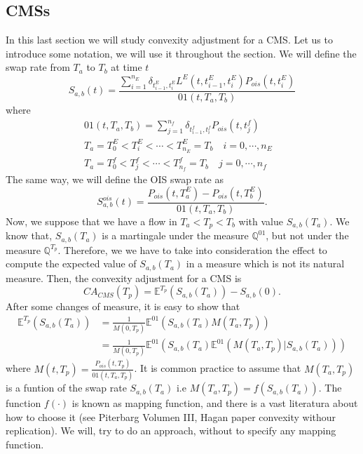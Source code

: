 \documentclass[a4paper,10pt]{article}
\newcommand{\1}{\mathbf{1}}
\begin{document}
\subsection{CMSs}
In this last section we will study convexity adjustment for a CMS. Let us to introduce some notation, we will use it throughout the section. We will define the swap rate from $T_a$ to $T_b$ at time $t$
\begin{equation*}
S_{a,b}(t) = \frac{\sum_{i=1}^{n_E}\delta_{t^{E}_{i-1}, t^{E}_i} L^{E}(t,t^{E}_{i-1}, t^{E}_{i}) P_{ois}(t,t^{E}_{i})}{01(t,T_a,T_b)}
\end{equation*}
where
\begin{align*}
01(t,T_a,T_b) = \sum_{j=1}^{n_f} \delta_{t^{f}_{i-1}, t^{f}_i} P_{ois}(t,t^{f}_{j}) \\
T_a=T^{E}_0 < T^{E}_i< \cdots < T^{E}_{n_E}=T_b \quad i=0,\cdots,n_E&  \\
T_a=T^{f}_0 < T^{f}_j< \cdots < T^{f}_{n_f}=T_b \quad j=0,\cdots,n_f&
\end{align*}
The same way, we will define the OIS swap rate as
\begin{equation*}
S^{ois}_{a,b}(t) = \frac{P_{ois}(t,T^{E}_a) - P_{ois}(t,T^{E}_b)}{01(t,T_a,T_b)}. 
\end{equation*}
Now, we suppose that we have a flow in $T_a < T_p < T_b$ with value $S_{a,b}(T_a)$. We know that, $S_{a,b}(T_a)$ is a martingale under the measure $\mathbb{Q}^{01}$, but not under the measure $\mathbb{Q}^{T_p}$. Therefore, we we have to take into consideration the effect to compute the expected value of $S_{a,b}(T_a)$ in a measure which is not its natural measure. Then, the convexity adjustment for a CMS is
\begin{equation}
CA_{CMS}(T_p) = \mathbb{E}^{T_p}\left(S_{a,b}(T_a)\right) - S_{a,b}(0).
\end{equation} 
After some changes of measure, it is easy to show that
\begin{align}\label{expected_t_p_cms}
\mathbb{E}^{T_p}\left(S_{a,b}(T_a)\right) &= \frac{1}{M(0,T_p)} \mathbb{E}^{01}\left(S_{a,b}(T_a) M(T_a,T_p)\right) \nonumber \\
&= \frac{1}{M(0,T_p)} \mathbb{E}^{01}\left(S_{a,b}(T_a) \mathbb{E}^{01}\left( M(T_a,T_p)|S_{a,b}(T_a)\right) \right)
\end{align}
where $M(t,T_p)= \frac{P_{ois}(t,T_p)}{01(t,T_a,T_p)}$. It is common practice to assume that $M(T_a,T_p)$ is a funtion of the swap rate $S_{a,b}(T_a)$ i.e   $M(T_a,T_p)=f(S_{a,b}(T_a))$. The function $f(\cdot)$ is known as mapping function, and there is a vast literatura about how to choose it (see Piterbarg Volumen III, Hagan paper convexity withour replication). We will, try to do an approach, without to specify any mapping function.
\end{document}
